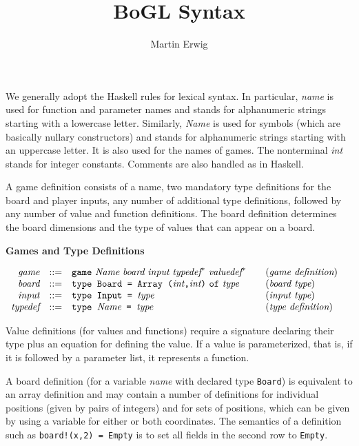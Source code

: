 \documentclass[11pt]{article}
\makeatletter
\newcommand{\prodName}[1]{&(\emph{#1})\\}
\newcommand{\nt}[1]{\textit{#1}}
\newcommand{\prog}[1]{\texttt{#1}}
\newcommand{\IS}{&::=&}
\newcommand{\syntax}[2]{
  \needspace{3\baselineskip}
  \bigskip\par\noindent\textbf{#1}\par\smallskip%
  $\begin{array}{rcl@{\qquad}l}#2\end{array}$%
  \par\bigskip\noindent\ignorespaces
}
\newcommand{\lp}{\prog{(}}
\newcommand{\rp}{\prog{)}}
\newcommand{\paren}[1]{\lp#1\rp}
\newcommand{\pair}[2]{\paren{#1\prog{,}#2}}
\makeatother
\begin{document}
\title{BoGL Syntax}
\author{Martin Erwig}
\maketitle

\noindent
%
We generally adopt the Haskell rules for lexical syntax. In particular,
\nt{name} is used for function and parameter names and stands for alphanumeric
strings starting with a lowercase letter.
%
Similarly, \nt{Name} is used for symbols (which are basically nullary
constructors) and stands for alphanumeric strings starting with an uppercase
letter. It is also used for the names of games.
%
The nonterminal \nt{int} stands for integer constants.
%
Comments are also handled as in Haskell.

A game definition consists of a name, two mandatory type definitions for the
board and player inputs, any number of additional type definitions, followed by
any number of value and function definitions.
%
The board definition determines the board dimensions and the type of values
that can appear on a board.

\syntax{Games and Type Definitions}{
\nt{game}    \IS  \prog{game}\ \nt{Name}\ \nt{board}\ \nt{input}
                  \ \nt{typedef}^*\ \nt{valuedef}^*
                                                     \prodName{game definition}
\nt{board}   \IS  \prog{type Board = Array }\pair{\nt{int}}{\nt{int}}\
                  \prog{of}\ \nt{type}                \prodName{board type}
\nt{input}   \IS  \prog{type Input = }\nt{type}      \prodName{input type}
\nt{typedef} \IS  \prog{type }\nt{Name}\prog{ = }\nt{type}      \prodName{type definition}
}
%
Value definitions (for values and functions) require a signature declaring
their type plus an equation for defining the value. If a value is
parameterized, that is, if it is followed by a parameter list, it represents a
function.

A board definition (for a variable \nt{name} with declared type \prog{Board})
is equivalent to an array definition and may contain a number of definitions
for individual positions (given by pairs of integers) and for sets of
positions, which can be given by using a variable for either or both
coordinates. The semantics of a definition such as \prog{board!(x,2)~=~Empty}
is to set all fields in the second row to \prog{Empty}.
\end{document}
